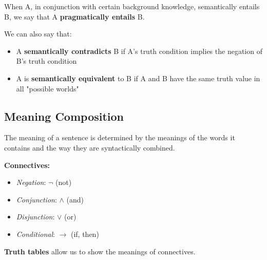 \documentclass[12pt]{article}
\begin{document}
\begin{definitionEnd}
  When A, in conjunction with certain background knowledge, semantically entails B, we say that A \textbf{pragmatically entails} B.
\end{definitionEnd}

We can also say that: \begin{itemize}
  \item A \textbf{semantically contradicts} B if A's truth condition implies the negation of B's truth condition
  \item A is \textbf{semantically equivalent} to B if A and B have the same truth value in all "possible worlds"
\end{itemize}

\subsection{Meaning Composition}
\begin{definitionEnd}
  The meaning of a sentence is determined by the meanings of the words it contains and the way they are syntactically combined.
\end{definitionEnd}

\textbf{Connectives:}\begin{itemize}
  \item \textit{Negation}: $\neg$ (not)
  \item \textit{Conjunction}: $\wedge$ (and)
  \item \textit{Disjunction}: $\vee$ (or)
  \item \textit{Conditional}: $\rightarrow$ (if, then)
\end{itemize}

\textbf{Truth tables} allow us to show the meanings of connectives.
\end{document}
